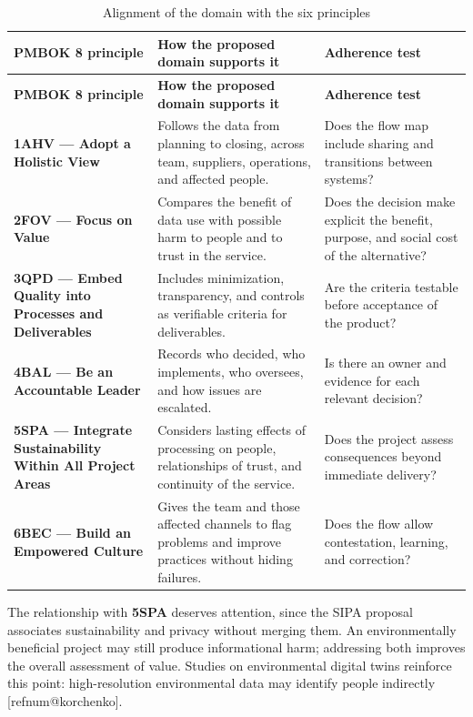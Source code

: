 \documentclass[11pt,a4paper]{article}
\makeatletter
\newcommand{\refnum}[1]{\csname refnum@#1\endcsname}
\newcommand{\cit}[1]{[\refnum{#1}]}
\newcommand{\SingleSpacing}{}
\newcommand{\fontetab}[1]{\par\vspace{3pt}{\small\noindent Source: #1\par}}
\makeatother
\begin{document}
\begingroup\SingleSpacing\small
\begin{longtable}{@{}>{\raggedright\arraybackslash}p{}>{\raggedright\arraybackslash}p{}>{\raggedright\arraybackslash}p{}@{}}
\caption{Alignment of the domain with the six principles}\label{tab:t9}\\
\toprule
\textbf{PMBOK 8 principle} & \textbf{How the proposed domain supports it} & \textbf{Adherence test}\\
\midrule
\endfirsthead
\toprule
\textbf{PMBOK 8 principle} & \textbf{How the proposed domain supports it} & \textbf{Adherence test}\\
\midrule
\endhead
\bottomrule
\endfoot
\bottomrule
\endlastfoot
\textbf{1AHV — Adopt a Holistic View} & Follows the data from planning to closing, across team, suppliers, operations, and affected people. & Does the flow map include sharing and transitions between systems?\\[3pt]
\textbf{2FOV — Focus on Value} & Compares the benefit of data use with possible harm to people and to trust in the service. & Does the decision make explicit the benefit, purpose, and social cost of the alternative?\\[3pt]
\textbf{3QPD — Embed Quality into Processes and Deliverables} & Includes minimization, transparency, and controls as verifiable criteria for deliverables. & Are the criteria testable before acceptance of the product?\\[3pt]
\textbf{4BAL — Be an Accountable Leader} & Records who decided, who implements, who oversees, and how issues are escalated. & Is there an owner and evidence for each relevant decision?\\[3pt]
\textbf{5SPA — Integrate Sustainability Within All Project Areas} & Considers lasting effects of processing on people, relationships of trust, and continuity of the service. & Does the project assess consequences beyond immediate delivery?\\[3pt]
\textbf{6BEC — Build an Empowered Culture} & Gives the team and those affected channels to flag problems and improve practices without hiding failures. & Does the flow allow contestation, learning, and correction?\\[3pt]
\end{longtable}
\endgroup
\fontetab{Prepared by the authors (2026), based on \cit{pmi}.}

The relationship with \textbf{5SPA} deserves attention, since the SIPA proposal associates sustainability and privacy without merging them. An environmentally beneficial project may still produce informational harm; addressing both improves the overall assessment of value. Studies on environmental digital twins reinforce this point: high-resolution environmental data may identify people indirectly [\refnum{korchenko}].
\end{document}
